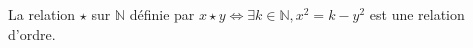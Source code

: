 La relation $\star$ sur $\mathbb N$ définie par $x\star y \iff \exists k\in\mathbb N, x^2=k-y^2$ est une relation d'ordre.

\begin{reponses}
\end{reponses}

